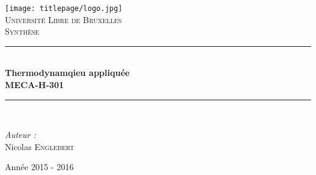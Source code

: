 \AddToShipoutPicture*{\BackgroundPic}
\begin{titlepage}
\begin{center}	
	
	\newcommand{\HRule}{\rule{\linewidth}{0.5mm}}   			            %
	\texttt{[image: titlepage/logo.jpg]}~\\[1cm]				%

	\textsc{\LARGE Université Libre de Bruxelles}\\[1.5cm]
	\textsc{\Large Synthèse}\\[0.5cm]

	\HRule \\[0.4cm]
	{ \huge \bfseries Thermodynamqieu appliquée \ \\MECA-H-301 \\[0.4cm] }



	\HRule \\[1.5cm]
		\begin{minipage}{0.4\textwidth}
		\begin{flushleft} \large
		
		\emph{Auteur :}\\
			Nicolas \textsc{Englebert}

			\end{flushleft}
			\end{minipage}
			\begin{minipage}{0.4\textwidth}
			\begin{flushright} \large
			\end{flushright}
		\end{minipage}

	\vfill

{\large Année 2015 - 2016}

\end{center}
\end{titlepage}

